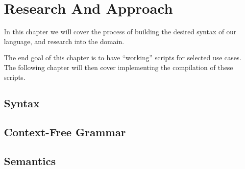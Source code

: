 \chapter{Research And Approach}\label{ch:approach}
In this chapter we will cover the process of building the desired syntax of our language, and research into the domain.

The end goal of this chapter is to have ``working'' scripts for selected use cases.
The following chapter will then cover implementing the compilation of these scripts.


\section{Syntax}\label{sec:syntax}


\section{Context-Free Grammar}\label{sec:grammar}


\section{Semantics}\label{sec:semantics}

